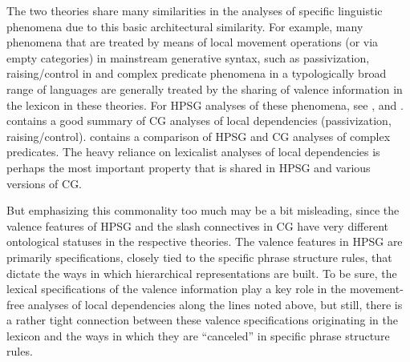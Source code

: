 \documentclass[output=paper
                ,modfonts
 	        ,biblatex
                ,babelshorthands
                ,newtxmath
                ,draftmode
                ,colorlinks, citecolor=brown
]{langscibook}
\begin{document}
The two theories share many similarities in the
analyses of specific linguistic phenomena due to this basic
architectural similarity. For example, many phenomena that are treated
by means of local movement operations (or via empty categories) in
mainstream generative syntax, such as passivization, raising/control in 
and complex predicate phenomena in a typologically broad range of
languages are generally treated by the sharing of valence information
in the lexicon in these theories. For HPSG
analyses of these phenomena, see
,  
and .
\citet{steedman2011ccg} contains a good
summary of CG analyses of local dependencies 
(passivization, raising/control). \citet[Section~4.2]{Kubota2014a-u} contains
a comparison of HPSG and CG analyses of complex predicates.
The heavy reliance on lexicalist analyses of
local dependencies 
is perhaps the most important property that is shared  in
HPSG and various versions of CG.

But emphasizing this commonality too much may be a bit misleading,
since the valence features of HPSG and the slash connectives in CG
have very different ontological statuses in the respective theories.
The valence features in HPSG are primarily specifications, closely
tied to the specific phrase structure rules, that dictate the ways in
which hierarchical representations are built. To be sure, the lexical
specifications of the valence information play a key role in the
movement-free analyses of local dependencies along the lines noted
above, but still, there is a rather tight connection between these
valence specifications originating in the lexicon and the ways in
which they are ``canceled'' in specific phrase structure rules.
\end{document}

